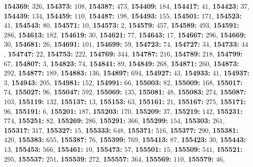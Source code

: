 \textsf{\bfseries 154369:} $326$, \textsf{\bfseries 154373:} $108$, \textsf{\bfseries 154387:} $473$, \textsf{\bfseries 154409:} $184$, \textsf{\bfseries 154417:} $41$, \textsf{\bfseries 154423:} $37$, \textsf{\bfseries 154439:} $134$, \textsf{\bfseries 154459:} $110$, \textsf{\bfseries 154487:} $198$, \textsf{\bfseries 154493:} $155$, \textsf{\bfseries 154501:} $171$, \textsf{\bfseries 154523:} $41$, \textsf{\bfseries 154543:} $80$, \textsf{\bfseries 154571:} $10$, \textsf{\bfseries 154573:} $2$, \textsf{\bfseries 154579:} $457$, \textsf{\bfseries 154589:} $493$, \textsf{\bfseries 154591:} $286$, \textsf{\bfseries 154613:} $182$, \textsf{\bfseries 154619:} $30$, \textsf{\bfseries 154621:} $77$, \textsf{\bfseries 154643:} $17$, \textsf{\bfseries 154667:} $296$, \textsf{\bfseries 154669:} $30$, \textsf{\bfseries 154681:} $26$, \textsf{\bfseries 154691:} $101$, \textsf{\bfseries 154699:} $59$, \textsf{\bfseries 154723:} $74$, \textsf{\bfseries 154727:} $34$, \textsf{\bfseries 154733:} $44$, \textsf{\bfseries 154747:} $22$, \textsf{\bfseries 154753:} $222$, \textsf{\bfseries 154769:} $344$, \textsf{\bfseries 154787:} $216$, \textsf{\bfseries 154789:} $218$, \textsf{\bfseries 154799:} $67$, \textsf{\bfseries 154807:} $3$, \textsf{\bfseries 154823:} $74$, \textsf{\bfseries 154841:} $89$, \textsf{\bfseries 154849:} $268$, \textsf{\bfseries 154871:} $260$, \textsf{\bfseries 154873:} $292$, \textsf{\bfseries 154877:} $189$, \textsf{\bfseries 154883:} $136$, \textsf{\bfseries 154897:} $694$, \textsf{\bfseries 154927:} $43$, \textsf{\bfseries 154933:} $41$, \textsf{\bfseries 154937:} $3$, \textsf{\bfseries 154943:} $205$, \textsf{\bfseries 154981:} $152$, \textsf{\bfseries 154991:} $66$, \textsf{\bfseries 155003:} $82$, \textsf{\bfseries 155009:} $168$, \textsf{\bfseries 155017:} $74$, \textsf{\bfseries 155027:} $96$, \textsf{\bfseries 155047:} $592$, \textsf{\bfseries 155069:} $135$, \textsf{\bfseries 155081:} $48$, \textsf{\bfseries 155083:} $274$, \textsf{\bfseries 155087:} $103$, \textsf{\bfseries 155119:} $132$, \textsf{\bfseries 155137:} $13$, \textsf{\bfseries 155153:} $63$, \textsf{\bfseries 155161:} $21$, \textsf{\bfseries 155167:} $275$, \textsf{\bfseries 155171:} $96$, \textsf{\bfseries 155191:} $6$, \textsf{\bfseries 155201:} $187$, \textsf{\bfseries 155203:} $170$, \textsf{\bfseries 155209:} $37$, \textsf{\bfseries 155219:} $142$, \textsf{\bfseries 155231:} $774$, \textsf{\bfseries 155251:} $82$, \textsf{\bfseries 155269:} $286$, \textsf{\bfseries 155291:} $366$, \textsf{\bfseries 155299:} $154$, \textsf{\bfseries 155303:} $261$, \textsf{\bfseries 155317:} $317$, \textsf{\bfseries 155327:} $15$, \textsf{\bfseries 155333:} $648$, \textsf{\bfseries 155371:} $516$, \textsf{\bfseries 155377:} $290$, \textsf{\bfseries 155381:} $420$, \textsf{\bfseries 155383:} $655$, \textsf{\bfseries 155387:} $76$, \textsf{\bfseries 155399:} $769$, \textsf{\bfseries 155413:} $87$, \textsf{\bfseries 155423:} $30$, \textsf{\bfseries 155443:} $13$, \textsf{\bfseries 155453:} $566$, \textsf{\bfseries 155461:} $10$, \textsf{\bfseries 155473:} $57$, \textsf{\bfseries 155501:} $15$, \textsf{\bfseries 155509:} $541$, \textsf{\bfseries 155521:} $295$, \textsf{\bfseries 155537:} $251$, \textsf{\bfseries 155539:} $272$, \textsf{\bfseries 155557:} $364$, \textsf{\bfseries 155569:} $110$, \textsf{\bfseries 155579:} $46$, 
